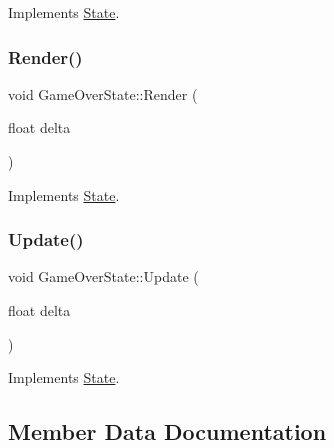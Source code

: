 Implements \hyperlink{classState_a1705412877f37a5cc8fc712542756076}{State}.

\mbox{\label{classGameOverState_ac9c9ef71b0a12940ac5caa7763f23fdc}} 
\subsubsection{\texorpdfstring{Render()}{Render()}}
{\footnotesize\ttfamily void Game\+Over\+State\+::\+Render (\begin{DoxyParamCaption}\item[{float}]{delta }\end{DoxyParamCaption})\hspace{0.3cm}{\ttfamily [virtual]}}



Implements \hyperlink{classState_a0e48dfae1e3090630475812681417c5f}{State}.

\mbox{\label{classGameOverState_a4dc49d576a9435531f502660119800a9}} 
\subsubsection{\texorpdfstring{Update()}{Update()}}
{\footnotesize\ttfamily void Game\+Over\+State\+::\+Update (\begin{DoxyParamCaption}\item[{float}]{delta }\end{DoxyParamCaption})\hspace{0.3cm}{\ttfamily [virtual]}}



Implements \hyperlink{classState_aac0d3fdee1341e168af730b8f31a7bf1}{State}.



\subsection{Member Data Documentation}
\mbox{\label{classGameOverState_aa3f7f4b44aff376ce1b4aec52fece514}} 
